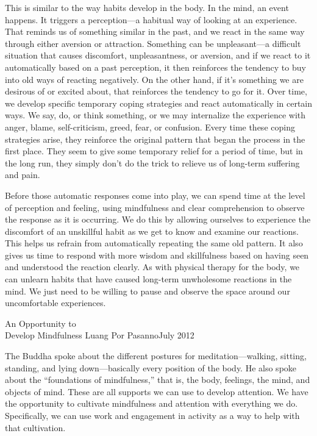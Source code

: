 This is similar to the way habits develop in the body. In the mind, an 
event happens. It triggers a perception---a habitual way of looking at 
an experience. That reminds us of something similar in the past, and we 
react in the same way through either aversion or attraction. Something 
can be unpleasant---a difficult situation that causes discomfort, 
unpleasantness, or aversion, and if we react to it automatically based 
on a past perception, it then reinforces the tendency to buy into old 
ways of reacting negatively. On the other hand, if it's something we 
are desirous of or excited about, that reinforces the tendency to go 
for it. Over time, we develop specific temporary coping strategies and 
react automatically in certain ways. We say, do, or think something, or 
we may internalize the experience with anger, blame, self-criticism, 
greed, fear, or confusion. Every time these coping strategies arise, 
they reinforce the original pattern that began the process in the first 
place. They seem to give some temporary relief for a period of time, 
but in the long run, they simply don't do the trick to relieve us of 
long-term suffering and pain.

Before those automatic responses come into play, we can spend time at
the level of perception and feeling, using \mbox{mindfulness} and clear
comprehension to observe the response as it is occurring. We do this by
allowing ourselves to experience the discomfort of an unskillful habit
as we get to know and examine our reactions. This helps us refrain from
automatically repeating the same old pattern. It also gives us time to
respond with more wisdom and skillfulness based on having seen and
understood the reaction clearly. As with physical therapy for the body,
we can unlearn habits that have caused long-term unwholesome reactions
in the mind. We just need to be willing to pause and observe the space
around our uncomfortable experiences.

{An Opportunity to\\Develop Mindfulness}
{Luang Por Pasanno}{July 2012}

The Buddha spoke about the different postures for meditation---walking, 
sitting, standing, and lying down---basically every position of the 
body. He also spoke about the ``foundations of mindfulness,'' that is, 
the body, feelings, the mind, and objects of mind. These are all 
supports we can use to develop attention. We have the opportunity to 
cultivate mindfulness and attention with everything we do. 
Specifically, we can use work and engagement in activity as a way to 
help with that cultivation.

